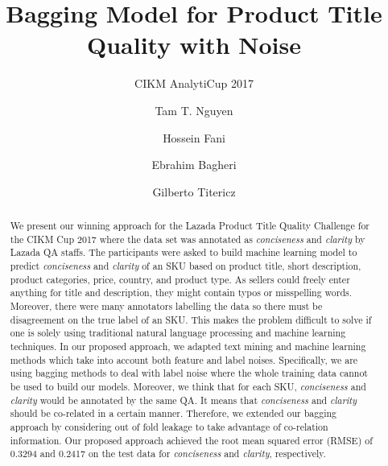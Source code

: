 \documentclass[sigconf]{acmart}
\begin{document}
\title{Bagging Model for Product Title Quality with Noise}
\subtitle{CIKM AnalytiCup 2017}

\author{Tam T. Nguyen}

\author{Hossein Fani}
\authornotemark[3]

\author{Ebrahim Bagheri}
\authornotemark[3]

\author{Gilberto Titericz}

\renewcommand{\shortauthors}{T. Nguyen et al.}


\begin{abstract}
We present our winning approach for the Lazada Product Title Quality Challenge for the CIKM Cup 2017 where the data set was annotated as \textit{conciseness} and \textit{clarity} by Lazada QA staffs. The participants were asked to build machine learning model to predict \textit{conciseness} and \textit{clarity} of an SKU based on product title, short description, product categories, price, country, and product type. As sellers could freely enter anything for title and description, they might contain typos or misspelling words. Moreover, there were many annotators labelling the data so there must be disagreement on the true label of an SKU. This makes the problem difficult to solve if one is solely using traditional natural language processing and machine learning techniques. In our proposed approach, we adapted text mining and machine learning methods which take into account both feature and label noises. Specifically, we are using bagging methods to deal with label noise where the whole training data cannot be used to build our models. Moreover, we think that for each SKU, \textit{conciseness} and \textit{clarity} would be annotated by the same QA. It means that \textit{conciseness} and \textit{clarity} should be co-related in a certain manner. Therefore, we extended our bagging approach by considering out of fold leakage to take advantage of co-relation information. Our proposed approach achieved the root mean squared error (RMSE) of 0.3294 and 0.2417 on the test data for \textit{conciseness} and \textit{clarity}, respectively. 

\end{abstract}
\end{document}
